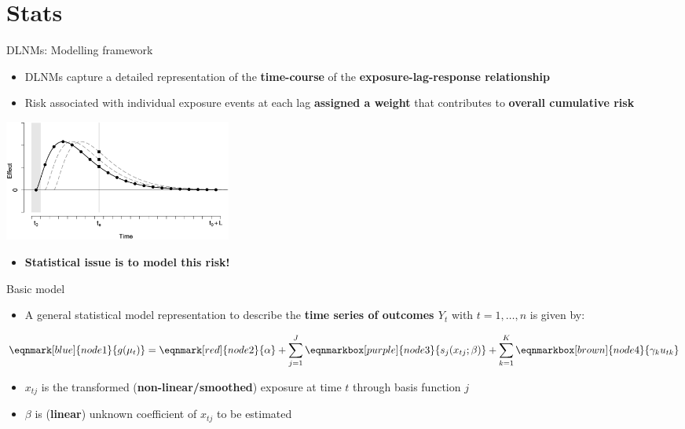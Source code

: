 \documentclass[english]{beamer}
\newcommand{\alertblue}[1]{{\color{blue}#1}}
\begin{document}
\section{Stats}
\begin{frame}{DLNMs: Modelling framework}
    \begin{itemize}
        \item DLNMs capture a detailed representation of the \alertblue{\textbf{time-course}} of the \alertblue{\textbf{exposure-lag-response relationship}}
         \item Risk associated with individual exposure events at each lag \alertblue{\textbf{assigned a weight}} that contributes to \alertblue{\textbf{overall cumulative risk}}
  \end{itemize}  
    \centering
        \includegraphics[width=7.5cm,keepaspectratio]{images/delayed effect.png}
  \begin{itemize}
        \item \textbf{\alertblue{Statistical issue is to model this risk!}}
  \end{itemize} 
\end{frame}
\begin{frame}{Basic model}
\begin{itemize}
        \item A general statistical model representation to describe the \alertblue{\textbf{time series of outcomes \( Y_t \)}} with \alertblue{\textbf{\( t = 1, \dots, n \)}} is given by: 
        \vspace{0.3cm}
\end{itemize}
\vspace{0.3cm}
\begin{equation*}
        \eqnmark[blue]{node1}{g(\mu_t)} =
        \eqnmark[red]{node2}{\alpha} +
        \sum_{j=1}^{J} \eqnmarkbox[purple]{node3}{s_j(x_{tj}; \beta)} +
        \sum_{k=1}^{K} \eqnmarkbox[brown]{node4}{\gamma_k u_{tk}}
\end{equation*}
\vspace{0.3cm}
\begin{itemize}
        \item \alertblue{\(x_{tj}\)} is the transformed (\alertblue{\textbf{non-linear/smoothed}}) exposure at time \alertblue{\(t\)} through basis function \alertblue{\(j\)}
        \vspace{0.3cm}
        \item \alertblue{\(\beta\)} is (\alertblue{\textbf{linear}}) unknown coefficient of \alertblue{\(x_{tj}\)} to be estimated
\end{itemize}
\end{frame}
\end{document}
